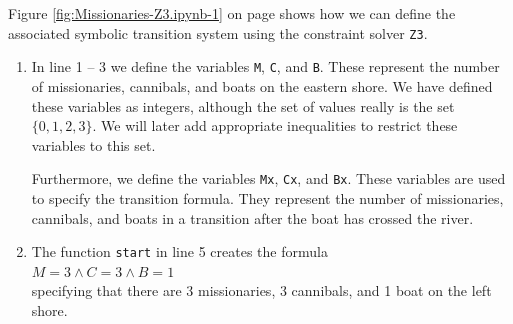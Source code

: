 Figure \ref{fig:Missionaries-Z3.ipynb-1} on page \pageref{fig:Missionaries-Z3.ipynb-1} shows how we can define
the associated symbolic transition system using the constraint solver \texttt{Z3}.
\begin{enumerate}
\item In line 1 -- 3 we define the variables \texttt{M}, \texttt{C}, and \texttt{B}.  These represent the
      number of missionaries, cannibals, and boats on the eastern shore.  We have defined these variables as
      integers, although the set of values really is the set $\{0,1,2,3\}$.  We will later add appropriate
      inequalities to restrict these variables to this set.

      Furthermore, we define the variables \texttt{Mx}, \texttt{Cx}, and \texttt{Bx}.  These variables are used
      to specify the transition formula.  They represent the
      number of missionaries, cannibals, and boats in a transition after the boat has crossed the river. 
\item The function \texttt{start} in line 5 creates the formula
      \\[0.2cm]
      \hspace*{1.3cm}
      $M = 3 \wedge C = 3 \wedge B = 1$
      \\[0.2cm]
      specifying that there are 3 missionaries, 3 cannibals, and 1 boat on the left shore.


\end{enumerate}
